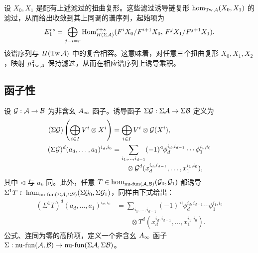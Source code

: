 设 $X_0,X_1$ 是配有上述滤过的扭曲复形。这些滤过诱导链复形 $\hom_{\operatorname{Tw}\mathcal A}(X_0,X_1)$ 的滤过，从而给出收敛到其上同调的谱序列，起始项为
\begin{equation}\label{eq:3.21}
E_1^{rs}=\bigoplus_{j-i=r}\operatorname{Hom}^{r+s}_{H(\Sigma\mathcal A)}(F^iX_0/F^{i+1}X_0,\,F^jX_1/F^{j+1}X_1).
\end{equation}
该谱序列与 $H(\operatorname{Tw}\mathcal A)$ 中的复合相容。这意味着，对任意三个扭曲复形 $X_0,X_1,X_2$，映射 $\mu^2_{\operatorname{Tw}\mathcal A}$ 保持滤过，从而在相应谱序列上诱导乘积。

\subsection{函子性}\label{sec:3m}
设 $\mathcal G:\mathcal A\to\mathcal B$ 为非含幺 $A_\infty$ 函子。诱导函子 $\Sigma\mathcal G:\Sigma\mathcal A\to\Sigma\mathcal B$ 定义为
\begin{equation}\label{eq:3.22}
\begin{aligned}
(\Sigma\mathcal G)\left(\bigoplus_{i\in I}V^i\otimes X^i\right)&=\bigoplus_{i\in I}V^i\otimes\mathcal G(X^i),\\
(\Sigma\mathcal G)^d(a_d,\ldots,a_1)^{i_d,i_0}
&=\sum_{i_1,\ldots,i_{d-1}}(-1)^{\triangleleft}\phi_d^{i_d,i_{d-1}}\cdots\phi_1^{i_1,i_0}\\[-2pt]
&\qquad\otimes\mathcal G^d(x_d^{i_d,i_{d-1}},\ldots,x_1^{i_1,i_0}),
\end{aligned}
\end{equation}
其中 $\triangleleft$ 与 $a_k$ 同。此外，任意 $T\in\hom_{\operatorname{nu\text{-}fun}(\mathcal A,\mathcal B)}(\mathcal G_0,\mathcal G_1)$ 都诱导 $\Sigma^1T\in\hom_{\operatorname{nu\text{-}fun}(\Sigma\mathcal A,\Sigma\mathcal B)}(\Sigma\mathcal G_0,\Sigma\mathcal G_1)$，同样由下式给出：
\begin{equation}\label{eq:3.23}
\begin{aligned}
(\Sigma^1T)^d(a_d,\ldots,a_1)^{i_d,i_0}
&=\sum_{i_1,\ldots,i_{d-1}}(-1)^{\triangleleft}\phi_d^{i_d,i_{d-1}}\cdots\phi_1^{i_1,i_0}\\[-2pt]
&\qquad\otimes T^d(x_d^{i_d,i_{d-1}},\ldots,x_1^{i_1,i_0}).
\end{aligned}
\end{equation}
公式、连同为零的高阶项，定义一个非含幺 $A_\infty$ 函子 $\Sigma:\operatorname{nu\text{-}fun}(\mathcal A,\mathcal B)\to\operatorname{nu\text{-}fun}(\Sigma\mathcal A,\Sigma\mathcal B)$。

